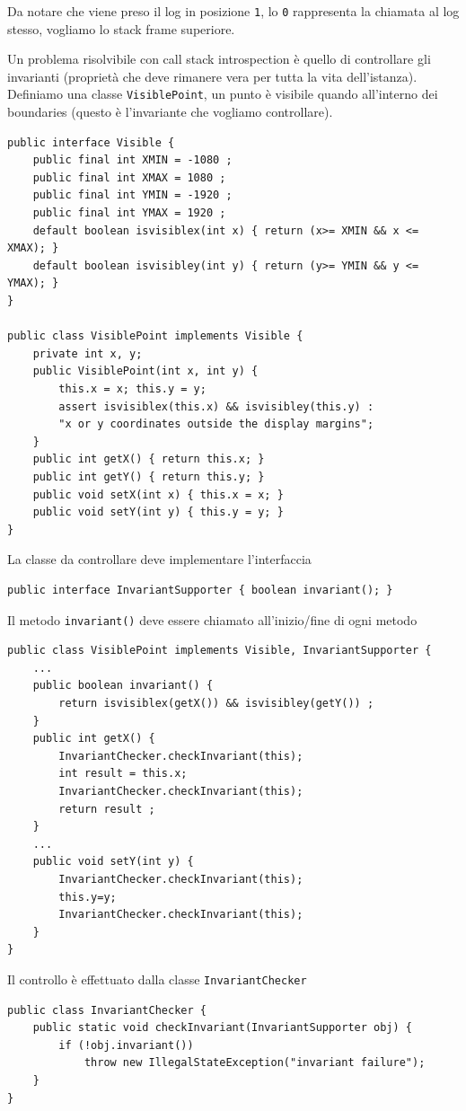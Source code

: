 Da notare che viene preso il log in posizione \texttt{1}, lo \texttt{0} rappresenta la chiamata al log stesso, vogliamo lo stack frame superiore.

Un problema risolvibile con call stack introspection è quello di controllare gli invarianti (proprietà che deve rimanere vera per tutta la vita dell'istanza). Definiamo una classe \texttt{VisiblePoint}, un punto è visibile quando all'interno dei boundaries (questo è l'invariante che vogliamo controllare).
\begin{verbatim}
public interface Visible {
    public final int XMIN = -1080 ;
    public final int XMAX = 1080 ;
    public final int YMIN = -1920 ;
    public final int YMAX = 1920 ;
    default boolean isvisiblex(int x) { return (x>= XMIN && x <= XMAX); }
    default boolean isvisibley(int y) { return (y>= YMIN && y <= YMAX); }
}

public class VisiblePoint implements Visible {
    private int x, y;
    public VisiblePoint(int x, int y) {
        this.x = x; this.y = y;
        assert isvisiblex(this.x) && isvisibley(this.y) :
        "x or y coordinates outside the display margins";
    }
    public int getX() { return this.x; }
    public int getY() { return this.y; }
    public void setX(int x) { this.x = x; }
    public void setY(int y) { this.y = y; }
}
\end{verbatim}

La classe da controllare deve implementare l'interfaccia
\begin{verbatim}
public interface InvariantSupporter { boolean invariant(); }
\end{verbatim}
Il metodo \texttt{invariant()} deve essere chiamato all'inizio/fine di ogni metodo
\begin{verbatim}
public class VisiblePoint implements Visible, InvariantSupporter {
    ...
    public boolean invariant() {
        return isvisiblex(getX()) && isvisibley(getY()) ;
    }
    public int getX() {
        InvariantChecker.checkInvariant(this);
        int result = this.x;
        InvariantChecker.checkInvariant(this);
        return result ;
    }
    ...
    public void setY(int y) {
        InvariantChecker.checkInvariant(this);
        this.y=y;
        InvariantChecker.checkInvariant(this);
    }
}
\end{verbatim}

Il controllo è effettuato dalla classe \texttt{InvariantChecker}
\begin{verbatim}
public class InvariantChecker {
    public static void checkInvariant(InvariantSupporter obj) {
        if (!obj.invariant())
            throw new IllegalStateException("invariant failure");
    }
}
\end{verbatim}

